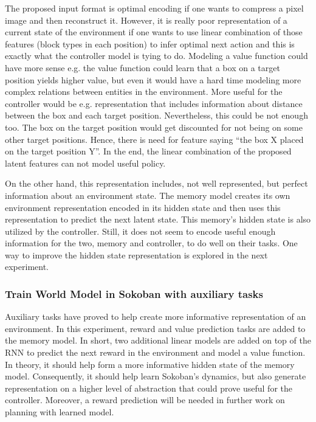The proposed input format is optimal encoding if one wants to compress a pixel image and then reconstruct it. However, it is really poor representation of a current state of the environment if one wants to use linear combination of those features (block types in each position) to infer optimal next action and this is exactly what the controller model is tying to do. Modeling a value function could have more sense e.g. the value function could learn that a box on a target position yields higher value, but even it would have a hard time modeling more complex relations between entities in the environment. More useful for the controller would be e.g. representation that includes information about distance between the box and each target position. Nevertheless, this could be not enough too. The box on the target position would get discounted for not being on some other target positions. Hence, there is need for feature saying “the box X placed on the target position Y”. In the end, the linear combination of the proposed latent features can not model useful policy.

On the other hand, this representation includes, not well represented, but perfect information about an environment state. The memory model creates its own environment representation encoded in its hidden state and then uses this representation to predict the next latent state. This memory's hidden state is also utilized by the controller. Still, it does not seem to encode useful enough information for the two, memory and controller, to do well on their tasks. One way to improve the hidden state representation is explored in the next experiment.

\subsubsection{Train World Model in Sokoban with auxiliary tasks}

Auxiliary tasks\cite{Algo.AuxiliaryTasks} have proved to help create more informative representation of an environment. In this experiment, reward and value prediction tasks are added to the memory model. In short, two additional linear models are added on top of the RNN to predict the next reward in the environment and model a value function. In theory, it should help form a more informative hidden state of the memory model. Consequently, it should help learn Sokoban’s dynamics, but also generate representation on a higher level of abstraction that could prove useful for the controller. Moreover, a reward prediction will be needed in further work on planning with learned model.

